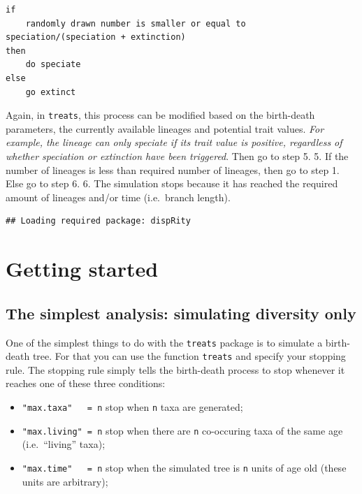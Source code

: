\documentclass[
]{book}
\providecommand{\tightlist}{%
  \setlength{\itemsep}{0pt}\setlength{\parskip}{0pt}}
\begin{document}
\begin{verbatim}
if
    randomly drawn number is smaller or equal to speciation/(speciation + extinction)
then
    do speciate
else
    go extinct
\end{verbatim}

Again, in \texttt{treats}, this process can be modified based on the birth-death parameters, the currently available lineages and potential trait values. \emph{For example, the lineage can only speciate if its trait value is positive, regardless of whether speciation or extinction have been triggered}.
Then go to step 5.
5. If the number of lineages is less than required number of lineages, then go to step 1. Else go to step 6.
6. The simulation stops because it has reached the required amount of lineages and/or time (i.e.~branch length).

\begin{verbatim}
## Loading required package: dispRity
\end{verbatim}

\hypertarget{gettingstarted}{%
\chapter{Getting started}\label{gettingstarted}}

\hypertarget{the-simplest-analysis-simulating-diversity-only}{%
\section{The simplest analysis: simulating diversity only}\label{the-simplest-analysis-simulating-diversity-only}}

One of the simplest things to do with the \texttt{treats} package is to simulate a birth-death tree.
For that you can use the function \texttt{treats} and specify your stopping rule.
The stopping rule simply tells the birth-death process to stop whenever it reaches one of these three conditions:

\begin{itemize}
\tightlist
\item
  \texttt{"max.taxa"\ \ \ =\ n} stop when \texttt{n} taxa are generated;
\item
  \texttt{"max.living"\ =\ n} stop when there are \texttt{n} co-occuring taxa of the same age (i.e.~``living'' taxa);
\item
  \texttt{"max.time"\ \ \ =\ n} stop when the simulated tree is \texttt{n} units of age old (these units are arbitrary);
\end{itemize}
\end{document}
